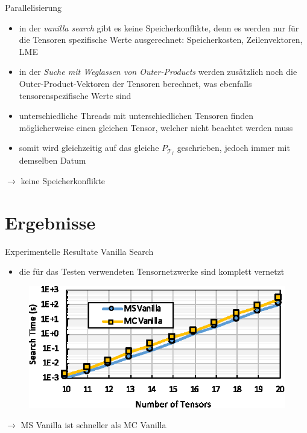 \documentclass{beamer}
\newcommand{\Tau}{\bm{\mathcal{T}}}
\begin{document}
\begin{frame}{Parallelisierung}
	\begin{itemize}
		\item in der \textit{vanilla search} gibt es keine Speicherkonflikte, denn es werden nur für die Tensoren spezifische Werte ausgerechnet: Speicherkosten, Zeilenvektoren, LME \pause
		\item in der \textit{Suche mit Weglassen von Outer-Products} werden zusätzlich noch die Outer-Product-Vektoren der Tensoren berechnet, was ebenfalls tensorenspezifische Werte sind
		\item unterschiedliche Threads mit unterschiedlichen Tensoren finden möglicherweise einen gleichen Tensor, welcher nicht beachtet werden muss
		\item somit wird gleichzeitig auf das gleiche $P_{\Tau_I}$ geschrieben, jedoch immer mit demselben Datum
	\end{itemize} \pause
	$\rightarrow$ keine Speicherkonflikte
\end{frame}



\section{Ergebnisse}



\begin{frame}{Experimentelle Resultate Vanilla Search}
	\begin{itemize}
		\item die für das Testen verwendeten Tensornetzwerke sind komplett vernetzt
	\end{itemize}
	\begin{figure}
		\includegraphics{figure_08}
	\end{figure} \pause
	$\rightarrow$ MS Vanilla ist schneller als MC Vanilla
\end{frame}
\end{document}
